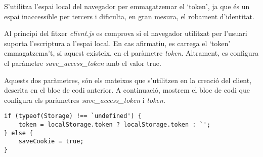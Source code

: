 S'utilitza l'espai local del navegador per emmagatzemar el `token', ja que és un espai inaccessible per tercers i dificulta, en gran mesura, el robament d'identitat.

Al principi del fitxer \emph{client.js} es comprova si el navegador utilitzat per l'usuari suporta l'escriptura a l'espai local. En cas afirmatiu, es carrega el `token' emmagatzema't, si aquest existeix, en el paràmetre \emph{token}. Altrament, es configura el paràmetre \emph{save\_access\_token} amb el valor true.

Aquests dos paràmetres, són els mateixos que s'utilitzen en la creació del client, descrita en el bloc de codi anterior. A continuació, mostrem el bloc de codi que configura els paràmetres \emph{save\_access\_token} i \emph{token}.

\begin{lstlisting}[style=rawOwn,caption={Configuració dels paràmetres \emph{access\_test\_token} i \emph{token}}]
if (typeof(Storage) !== `undefined') {
    token = localStorage.token ? localStorage.token : `';
} else {
    saveCookie = true;
}
\end{lstlisting}
